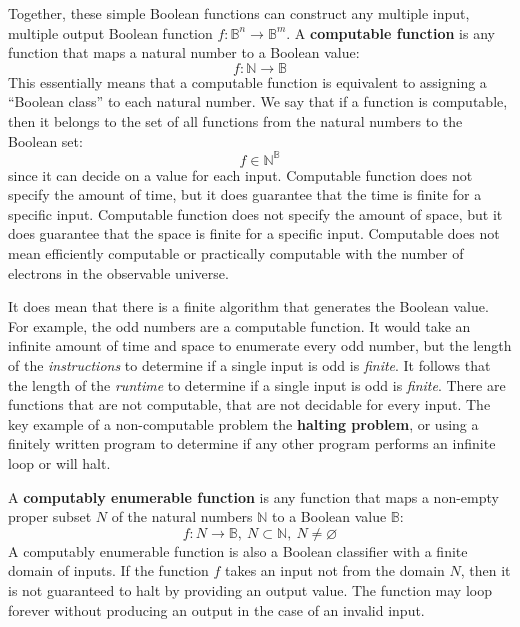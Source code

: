 \documentclass[10pt, a5paper, twoside, openright]{memoir}
\begin{document}
Together, these simple Boolean functions can construct any multiple input, multiple output Boolean function $f: \mathbb B^n \rightarrow \mathbb B^m$. A \textbf{computable function} is any function that maps a natural number to a Boolean value:
$$f: \mathbb N \rightarrow \mathbb B$$
This essentially means that a computable function is equivalent to assigning a ``Boolean class'' to each natural number. We say that if a function is computable, then it belongs to the set of all functions from the natural numbers to the Boolean set:
$$f \in \mathbb{N}^{\mathbb B}$$
since it can decide on a value for each input. Computable function does not specify the amount of time, but it does guarantee that the time is finite for a specific input. Computable function does not specify the amount of space, but it does guarantee that the space is finite for a specific input. Computable does not mean efficiently computable or practically computable with the number of electrons in the observable universe.

It does mean that there is a finite algorithm that generates the Boolean value. For example, the odd numbers are a computable function. It would take an infinite amount of time and space to enumerate every odd number, but the length of the \textit{instructions} to determine if a single input is odd is \textit{finite}. It follows that the length of the \textit{runtime} to determine if a single input is odd is \textit{finite}. There are functions that are not computable, that are not decidable for every input. The key example of a non-computable problem the \textbf{halting problem}, or using a finitely written program to determine if any other program performs an infinite loop or will halt.

A \textbf{computably enumerable function} is any function that maps a non-empty proper subset $N$ of the natural numbers $\mathbb N$ to a Boolean value $\mathbb B$:
$$f: N \rightarrow \mathbb B, \ N \subset \mathbb N, \ N \neq \varnothing$$
A computably enumerable function is also a Boolean classifier with a finite domain of inputs. If the function $f$ takes an input not from the domain $N$, then it is not guaranteed to halt by providing an output value. The function may loop forever without producing an output in the case of an invalid input.
\end{document}
